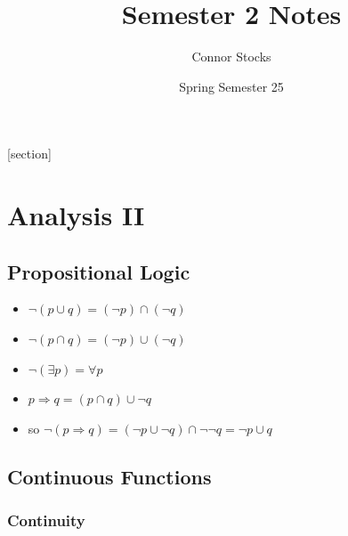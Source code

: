 \documentclass{article}
\title{Semester 2 Notes}
\author{Connor Stocks}
\date{Spring Semester 25}
\begin{document}
[section]
\newcommand{\equationref}{\stepcounter{eq}\arabic{section}.\arabic{eq}}
\newcommand{\tagequation}[1]{\[\tag{\equationref}#1\]}

\hypersetup{
    colorlinks,
    citecolor=black,
    filecolor=black,
    linkcolor=black,
    urlcolor=black
}

\maketitle

\newpage
\tableofcontents


\newpage
\section{Analysis II}
\subsection{Propositional Logic}




\begin{itemize}
    \item \(\lnot(p\cup q) = (\lnot p)\cap(\lnot q)\)
    \item \(\lnot(p\cap q) = (\lnot p)\cup(\lnot q)\)
    \item \(\lnot(\exists p) = \forall p\)
    \item \(p \Rightarrow q = (p\cap q)\cup \lnot q\)
    \item so \(\lnot (p\Rightarrow q) = (\lnot p \cup\lnot q)\cap \lnot\lnot q = \lnot p\cup q\)
\end{itemize}

\subsection{Continuous Functions}

\subsubsection*{Continuity}
\end{document}
